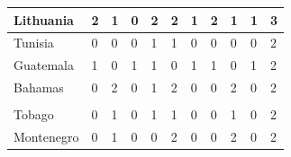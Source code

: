 \documentclass[12pt]{article}  %
\begin{document}
\begin{subappendices}
\begin{longtable}{|l|l|l|l|l|l|l|l|l|l|l|}
	\hline
	Lithuania                                                      & 2                                                 & 1                                                 & 0                                                 & 2                                                 & 2                                                 & 1                                                 & 2    & 1      & 1      & 3      \\ 
	\hline
	Tunisia                                                        & 0                                                 & 0                                                 & 0                                                 & 1                                                 & 1                                                 & 0                                                 & 0    & 0      & 0      & 2      \\ 
	\hline
	Guatemala                                                      & 1                                                 & 0                                                 & 1                                                 & 1                                                 & 0                                                 & 1                                                 & 1    & 0      & 1      & 2      \\ 
	\hline
	Bahamas                                                        & 0                                                 & 2                                                 & 0                                                 & 1                                                 & 2                                                 & 0                                                 & 0    & 2      & 0      & 2      \\ 
	\hline
	\begin{tabular}[c]{@{}l@{}}Trinidad and \\Tobago\end{tabular}  & 0                                                 & 1                                                 & 0                                                 & 1                                                 & 1                                                 & 0                                                 & 0    & 1      & 0      & 2      \\ 
	\hline
	Montenegro                                                     & 0                                                 & 1                                                 & 0                                                 & 0                                                 & 2                                                 & 0                                                 & 0    & 2      & 0      & 2      \\ 

\end{longtable}
\end{subappendices}
\end{document}

